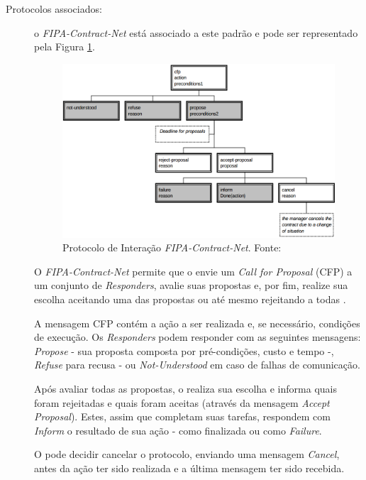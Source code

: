 \begin{description}
    \item[Protocolos associados:] o \textit{FIPA-Contract-Net} está associado a este padrão e pode ser representado pela Figura \ref{fig:contract_net_protocol}.

    \begin{figure}[!htb]
        \centering
        \includegraphics[scale=0.4]{figuras/contract-net-protocol.png}
        \caption{Protocolo de Interação \textit{FIPA-Contract-Net}. Fonte: }
        \label{fig:contract_net_protocol}
    \end{figure}

O \textit{FIPA-Contract-Net} permite que o \initiator envie um \textit{Call for Proposal} (CFP) a um conjunto de \textit{Responders}, avalie suas propostas e, por fim, realize sua escolha aceitando uma das propostas ou até mesmo rejeitando a todas \cite{jadeguide}.

A mensagem CFP contém a ação a ser realizada e, se necessário, condições de execução. Os \textit{Responders} podem responder com as seguintes mensagens: \textit{Propose} - sua proposta composta por pré-condições, custo e tempo -, \textit{Refuse} para recusa - ou \textit{Not-Understood} em caso de falhas de comunicação. 

Após avaliar todas as propostas, o \initiator realiza sua escolha e informa quais foram rejeitadas e quais foram aceitas (através da mensagem \textit{Accept Proposal}). Estes, assim que completam suas tarefas, respondem com \textit{Inform} o resultado de sua ação - como finalizada ou como \textit{Failure}.

O \initiator pode decidir cancelar o protocolo, enviando uma mensagem \textit{Cancel}, antes da ação ter sido realizada e a última mensagem ter sido recebida.



\end{description}
